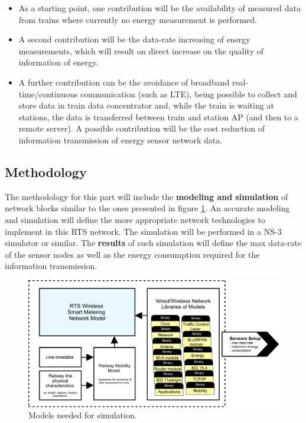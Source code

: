 \begin{itemize}
	\setlength\itemsep{1em}
	
	\item As a starting point, one contribution will be the availability of measured data from trains where currently no energy measurement is performed.
	
	\item A second contribution will be the data-rate increasing of energy measurements, which will result on direct increase on the quality of information of energy.
	
	\item A further contribution can be the avoidance of broadband real-time/continuous communication (such as LTE), being possible to collect and store data in train data concentrator and, while the train is waiting at stations, the data is transferred between train and station AP (and then to a remote server). A possible contribution will be the cost reduction of information transmission of energy sensor network data.
\end{itemize}

\subsection{Methodology}

The methodology for this part will include the \textbf{modeling and simulation} of network blocks similar to the ones presented in figure \ref{fig:4.methodWireless}. An accurate modeling and simulation will define the more appropriate network technologies to implement in this RTS network. 
The simulation will be performed in a NS-3 simulator or similar.
The \textbf{results} of such simulation will define the max data-rate of the sensor nodes as well as the energy consumption required for the information transmission.

\begin{figure}[h!]
	\centering
	\includegraphics[width=1\textwidth,keepaspectratio]{figures/4.Method/methodWireless}
	\caption{Models needed for simulation.}
	\label{fig:4.methodWireless}
\end{figure}

